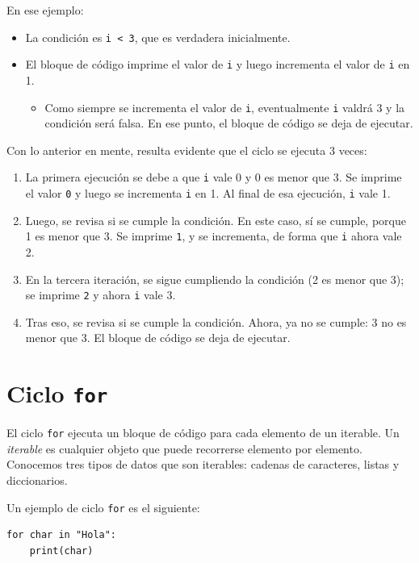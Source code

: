 En ese ejemplo:
\begin{itemize}
    \item La condición es \texttt{i < 3}, que es verdadera inicialmente.
    \item El bloque de código imprime el valor de \texttt{i} y luego incrementa el valor de \texttt{i} en 1.
    \begin{itemize}
        \item Como siempre se incrementa el valor de \texttt{i}, eventualmente \texttt{i} valdrá 3 y la condición será falsa. En ese punto, el bloque de código se deja de ejecutar.
    \end{itemize}
\end{itemize}
Con lo anterior en mente, resulta evidente que el ciclo se ejecuta 3 veces:
\begin{enumerate}
    \item La primera ejecución se debe a que \texttt{i} vale 0 y 0 es menor que 3. Se imprime el valor \texttt{0} y luego se incrementa \texttt{i} en 1. Al final de esa ejecución, \texttt{i} vale 1.
    \item Luego, se revisa si se cumple la condición. En este caso, sí se cumple, porque 1 es menor que 3. Se imprime \texttt{1}, y se incrementa, de forma que \texttt{i} ahora vale 2.
    \item En la tercera iteración, se sigue cumpliendo la condición (2 es menor que 3); se imprime \texttt{2} y ahora \texttt{i} vale 3.
    \item Tras eso, se revisa si se cumple la condición. Ahora, ya no se cumple: 3 no es menor que 3. El bloque de código se deja de ejecutar.
\end{enumerate}


\section{Ciclo \texttt{for}}

El ciclo \texttt{for} ejecuta un bloque de código para cada elemento de un iterable. Un \emph{iterable} es cualquier objeto que puede recorrerse elemento por elemento. Conocemos tres tipos de datos que son iterables: cadenas de caracteres, listas y diccionarios.

Un ejemplo de ciclo \texttt{for} es el siguiente:
\begin{verbatim}
for char in "Hola":
    print(char)
\end{verbatim}

